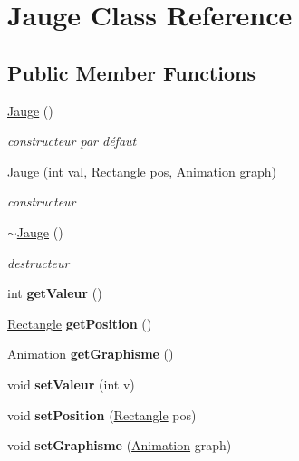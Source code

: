 \hypertarget{class_jauge}{}\section{Jauge Class Reference}
\label{class_jauge}
\subsection*{Public Member Functions}
\begin{DoxyCompactItemize}
\item 
\mbox{\label{class_jauge_af71fcd4a698426808029e4ecec459f58}} 
\hyperlink{class_jauge_af71fcd4a698426808029e4ecec459f58}{Jauge} ()
\begin{DoxyCompactList}\small\item\em constructeur par défaut \end{DoxyCompactList}\item 
\mbox{\label{class_jauge_a2ea943e1862010472fb2b6a6d7f1dba9}} 
\hyperlink{class_jauge_a2ea943e1862010472fb2b6a6d7f1dba9}{Jauge} (int val, \hyperlink{class_rectangle}{Rectangle} pos, \hyperlink{class_animation}{Animation} graph)
\begin{DoxyCompactList}\small\item\em constructeur \end{DoxyCompactList}\item 
\mbox{\label{class_jauge_a7a7c72b22e422a728d5fc37cd653c082}} 
\hyperlink{class_jauge_a7a7c72b22e422a728d5fc37cd653c082}{$\sim$\+Jauge} ()
\begin{DoxyCompactList}\small\item\em destructeur \end{DoxyCompactList}\item 
\mbox{\label{class_jauge_a0b1b00c831a0661c2a079be79a4e7d29}} 
int {\bfseries get\+Valeur} ()
\item 
\mbox{\label{class_jauge_a5bf77bcfddf15ca56b08d1293faf75c1}} 
\hyperlink{class_rectangle}{Rectangle} {\bfseries get\+Position} ()
\item 
\mbox{\label{class_jauge_abf35aa5bbb4e67a697dba85c94c29ed9}} 
\hyperlink{class_animation}{Animation} {\bfseries get\+Graphisme} ()
\item 
\mbox{\label{class_jauge_ad1d7c01f718469f4698d553a72327d89}} 
void {\bfseries set\+Valeur} (int v)
\item 
\mbox{\label{class_jauge_ae605dcd4ace193d0eb706950cf9330cc}} 
void {\bfseries set\+Position} (\hyperlink{class_rectangle}{Rectangle} pos)
\item 
\mbox{\label{class_jauge_ad30b576c9c378217d68f2bfa5ef3e149}} 
void {\bfseries set\+Graphisme} (\hyperlink{class_animation}{Animation} graph)
\end{DoxyCompactItemize}


